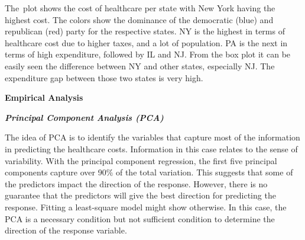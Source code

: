 \documentclass[12pt]{article}
\begin{document}

\par

\begin{justify}
The\ plot shows the cost of healthcare per state with New York having the highest cost. The colors show the dominance of the democratic (blue) and republican (red) party for the respective states. NY is the highest in terms of healthcare cost due to higher taxes, and a lot of population.  PA is the next in terms of high expenditure, followed by IL and NJ. From the box plot it can be easily seen the difference between NY and other states, especially NJ. The expenditure gap between those two states is very high.
\end{justify}\par


\vspace{\baselineskip}
\begin{adjustwidth}{0.25in}{0.0in}
\begin{Center}
\textbf{Empirical Analysis}
\end{Center}\par

\end{adjustwidth}

\setlength{\parskip}{12.0pt}
\begin{justify}
\textbf{\textit{Principal Component Analysis (PCA)}}
\end{justify}\par

\begin{justify}
The idea of PCA is to identify the variables that capture most of the information in predicting the healthcare costs. Information in this case relates to the sense of variability. With the principal component regression, the first five principal components capture over 90$\%$  of the total variation. This suggests that some of the predictors impact the direction of the response. However, there is no guarantee that the predictors will give the best direction for predicting the response. Fitting a least-square model might show otherwise. In this case, the PCA is a necessary condition but not sufficient condition to determine the direction of the response variable.
\end{justify}\par


\vspace{\baselineskip}
\end{document}
